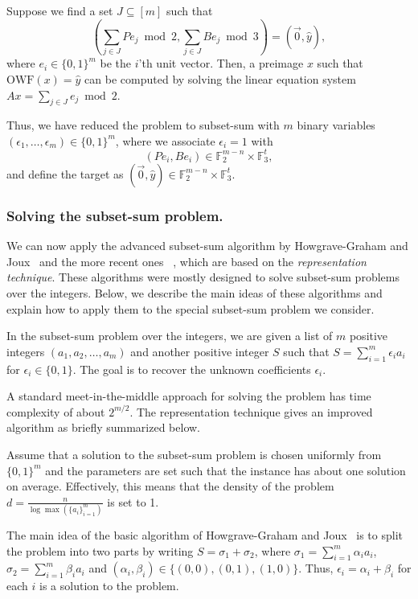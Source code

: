 \documentclass[orivec,envcountsect]{llncs}
\newcommand{\OWF}{\text{OWF}}
\begin{document}
Suppose we find a set $J \subseteq [m]$ such that
$$\left( \sum_{j \in J} Pe_j  \bmod 2, \sum_{j \in J} Be_j  \bmod 3 \right) = (\vec{0},\hat{y}),$$
where $e_i \in \{0,1\}^m$ be the $i$'th unit vector.
Then, a preimage $x$ such that $\OWF(x) = \hat{y}$ can be computed by solving the linear equation system
$Ax = \sum_{j \in J} e_j  \bmod 2$.

Thus, we have reduced the problem to subset-sum with $m$ binary variables
$(\epsilon_1, \ldots, \epsilon_m) \in \{0,1\}^m$, where we associate $\epsilon_i = 1$
with $$(Pe_i, Be_i) \in \mathbb{F}_2^{m-n} \times \mathbb{F}_3^t,$$
and define the target
as $(\vec{0},\hat{y}) \in \mathbb{F}_2^{m-n} \times \mathbb{F}_3^t$.


\subsubsection{Solving the subset-sum problem.}

We can now apply the advanced subset-sum algorithm by
Howgrave{-}Graham and Joux~\cite{Howgrave-GrahamJ10} and the more recent ones
~\cite{BeckerCJ11,BonnetainBSS20},
which are based on the \emph{representation technique}.
These algorithms were mostly designed to solve subset-sum problems over the integers.
Below, we describe the main ideas of these algorithms
and explain how to apply them to the special subset-sum problem
we consider.

In the subset-sum problem over the integers,
we are given a list of $m$ positive  integers $(a_1,a_2,\ldots,a_m)$
and another positive integer $S$ such that $S = \sum_{i=1}^{m} \epsilon_i a_i$
for $\epsilon_i \in \{0,1\}$. The goal is to recover the unknown coefficients $\epsilon_i$.

A standard meet-in-the-middle approach for solving the problem has time complexity of about $2^{m/2}$.
The representation technique gives an improved algorithm as briefly summarized below.

Assume that a solution to the subset-sum problem is chosen uniformly from $\{0,1\}^m$
and the parameters are set such that the instance has about one solution on average. Effectively, this means that the density of the problem $d = \tfrac{n}{\log \max(\{a_i\}_{i=1}^{m})}$ is set to 1.

The main idea of the basic algorithm of Howgrave{-}Graham and Joux~\cite{Howgrave-GrahamJ10}
is to split the problem into two parts by writing
$S = \sigma_1 + \sigma_2$,
where $\sigma_1 = \sum_{i=1}^{m} \alpha_i a_i$, $\sigma_2 = \sum_{i=1}^{m} \beta_i a_i$
and $(\alpha_i,\beta_i) \in \{(0,0),(0,1),(1,0)\}$.
Thus, $\epsilon_i = \alpha_i + \beta_i$ for each $i$ is a solution to the problem.
\end{document}
